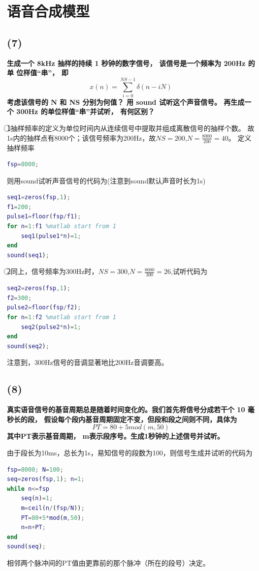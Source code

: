\documentclass[10pt]{article}
\begin{document}
\section{语音合成模型}
\subsection*{(7)}
\textbf{\color{gray}生成一个 8kHz 抽样的持续 1 秒钟的数字信号， 该信号是一个频率为 200Hz 的单
位样值“串”， 即$$x(n)=\sum_{i=0}^{NS-1}\delta(n-iN)$$考虑该信号的 N 和 NS 分别为何值？ 
用 sound 试听这个声音信号。 再生成一个 300Hz 的单位样值“串”并试听， 有何区别？ }

\textcircled{1}抽样频率的定义为单位时间内从连续信号中提取并组成离散信号的抽样个数。
故1s内的抽样点有8000个；该信号频率为200Hz，故$NS=200$,$N=\frac{8000}{200}=40$。
定义抽样频率
\begin{lstlisting}[language=matlab]
fsp=8000;
\end{lstlisting}
则用sound试听声音信号的代码为(注意到sound默认声音时长为1s)
\begin{lstlisting}[language=matlab]
seq1=zeros(fsp,1);
f1=200;
pulse1=floor(fsp/f1);
for n=1:f1 %matlab start from 1
    seq1(pulse1*n)=1;
end
sound(seq1);
\end{lstlisting}

\textcircled{2}同上，信号频率为300Hz时，$NS=300$,$N=\frac{8000}{300}=26$,试听代码为
\begin{lstlisting}[language=matlab]
seq2=zeros(fsp,1);
f2=300;
pulse2=floor(fsp/f2);
for n=1:f2 %matlab start from 1
    seq2(pulse2*n)=1;
end
sound(seq2);
	\end{lstlisting}

注意到，300Hz信号的音调显著地比200Hz音调要高。

\subsection*{(8)}
\textbf{\color{gray}真实语音信号的基音周期总是随着时间变化的。我们首先将信号分成若干个 10
毫秒长的段， 假设每个段内基音周期固定不变，但段和段之间则不同，具体为
$$PT = 80 + 5mod(m,50)$$
其中PT表示基音周期， m表示段序号。生成1秒钟的上述信号并试听。}

由于段长为10ms，总长为1s，易知信号的段数为100，则信号生成并试听的代码为
\begin{lstlisting}[language=matlab]
fsp=8000; N=100;
seq=zeros(fsp,1); n=1;
while n<=fsp
    seq(n)=1;
    m=ceil(n/(fsp/N));
    PT=80+5*mod(m,50);
    n=n+PT;
end
sound(seq);
\end{lstlisting}
相邻两个脉冲间的PT值由更靠前的那个脉冲（所在的段号）决定。
\end{document}
